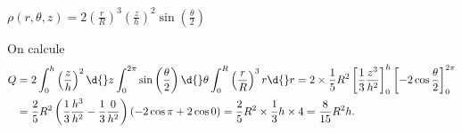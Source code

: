 \begin{enonce}	
	$\rho\left(r,\theta,z\right) = 2\left(\frac{r}{R}\right)^3\left(\frac{z}{h}\right)^2\sin\left(\frac{\theta}{2}\right)$
\end{enonce}


\begin{corrige}
On calcule
	\begin{align*}
		Q &= 2\int_{0}^{h} \left( \frac{z}{h} \right)^{2} \d{} z \int_{0}^{2\pi} \sin \left( \frac{\theta}{2} \right) \d{} \theta  \int_{0}^{R} \left( \frac{r}{R} \right)^3 r \d{}r 
		= 2 \times \frac{1}{5}R^2 \left[ \frac{1}{3}\frac{z^3}{h^2} \right]^{h}_{0} \left[ -2 \cos \frac{\theta}{2} \right]^{2\pi}_{0}\\
		&= \frac{2}{5}R^2 \left( \frac{1}{3}\frac{h^3}{h^2} - \frac{1}{3}\frac{0}{h^2} \right) \left( -2\cos \pi + 2 \cos 0 \right)
		= \frac{2}{5}R^2 \times \frac{1}{3} h \times 4 = \frac{8}{15}R^2h.
	\end{align*}
\end{corrige}

\finEntrainement





\afficheReponsesMelangees

\finFicheEntrainement                                                                        %


\ifdefined\mainIsLoaded\else
\printReponsesEtCorriges
\fi
